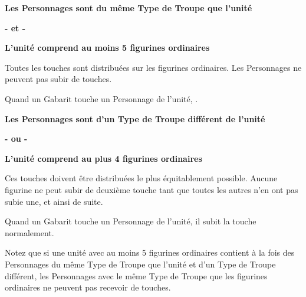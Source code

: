\setlength\columnseprule{0.5pt}
\begin{multicols}{2}\raggedcolumns

\noindent
\begin{center}\textbf{Les Personnages sont du même Type de Troupe que l'unité}\end{center}
\begin{center}\textbf{- et -}\end{center}
\begin{center}\textbf{L'unité comprend au moins 5 figurines ordinaires}\end{center}

\noindent Toutes les touches sont distribuées sur les figurines ordinaires. Les Personnages ne peuvent pas subir de touches.

\noindent Quand un Gabarit touche un Personnage de l'unité, .

\columnbreak

\noindent
\begin{center}\textbf{Les Personnages sont d'un Type de Troupe différent de l'unité}\end{center}
\begin{center}\textbf{- ou -}\end{center}
\begin{center}\textbf{L'unité comprend au plus 4 figurines ordinaires}\end{center}

\noindent {} Ces touches doivent être distribuées le plus équitablement possible. Aucune figurine ne peut subir de deuxième touche tant que toutes les autres n'en ont pas subie une, et ainsi de suite.

\noindent Quand un Gabarit touche un Personnage de l'unité, il subit la touche normalement.

\end{multicols}
\setlength\columnseprule{0pt}

Notez que si une unité avec au moins 5 figurines ordinaires contient à la fois des Personnages du même Type de Troupe que l'unité et d'un Type de Troupe différent, les Personnages avec le même Type de Troupe que les figurines ordinaires ne peuvent pas recevoir de touches.

\newpage
\subsection{\newfromWHB{\frontrank}}
\label{front_rank}

